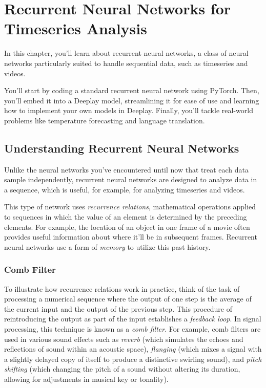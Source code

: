 \chapter[Recurrent Neural Networks for Timeseries Analysis]{Recurrent Neural Networks for Timeseries Analysis}\label{ch:07}

In this chapter, you'll learn about recurrent neural networks, a class of neural networks particularly suited to handle sequential data, such as timeseries and videos.

You'll start by coding a standard recurrent neural network using PyTorch. Then, you'll embed it into a Deeplay model, streamlining it for ease of use and learning how to implement your own models in Deeplay. Finally, you'll tackle real-world problems like temperature forecasting and language translation.

\section{Understanding Recurrent Neural Networks}

Unlike the neural networks you've encountered until now that treat each data sample independently, recurrent neural networks are designed to analyze data in a sequence, which is useful, for example, for analyzing timeseries and videos. 

This type of network uses \emph{recurrence relations}, mathematical operations applied to sequences in which the value of an element is determined by the preceding elements. For example, the location of an object in one frame of a movie often provides useful information about where it'll be in subsequent frames. Recurrent neural networks use a form of \emph{memory} to utilize this past history.

\subsection{Comb Filter}

To illustrate how recurrence relations work in practice, think of the task of processing a numerical sequence where the output of one step is the average of the current input and the output of the previous step. This procedure of reintroducing the output as part of the input establishes a \emph{feedback loop}. In signal processing, this technique is known as a \emph{comb filter}. For example, comb filters are used in various sound effects such as \emph{reverb} (which simulates the echoes and reflections of sound within an acoustic space), \emph{flanging} (which mixes a signal with a slightly delayed copy of itself to produce a distinctive swirling sound), and \emph{pitch shifting} (which changing the pitch of a sound without altering its duration, allowing for adjustments in musical key or tonality).


